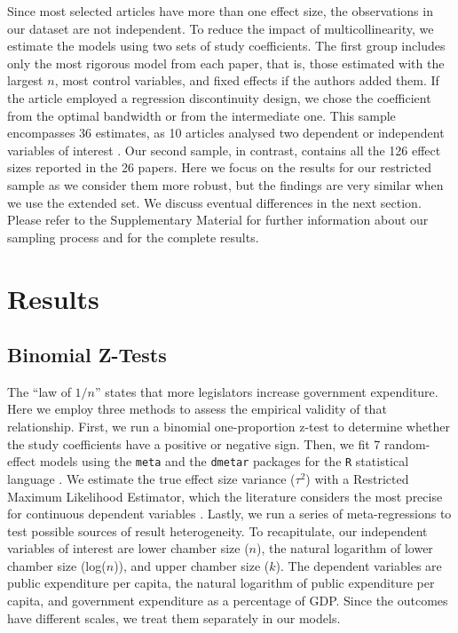 \documentclass[a4paper,12pt]{article}
\begin{document}
Since most selected articles have more than one effect size, the observations
in our dataset are not independent. To reduce the impact of multicollinearity,
we estimate the models using two sets of study coefficients. The first group
includes only the most rigorous model from each paper, that is, those estimated
with the largest $n$, most control variables, and fixed effects if the authors
added them. If the article employed a regression discontinuity design, we chose
the coefficient from the optimal bandwidth or from the intermediate one. This
sample encompasses 36 estimates, as 10 articles analysed two dependent or
independent variables of interest \citep{baqir1999districts, bjedov2014impact,
bradbury2001legislative, chen_malhotra_2007, crowley2019law,
lee2016supermajority, lee2018court, maldonado2013legislatures, primo2006stop,
ricciuti2003trading}. Our second sample, in contrast, contains all the 126 effect
sizes reported in the 26 papers. Here we focus on the results for our restricted
sample as we consider them more robust, but the findings are very similar when
we use the extended set. We discuss eventual differences in the next section.
Please refer to the Supplementary Material for further information about our
sampling process and for the complete results.

\section{Results}

\subsection{Binomial Z-Tests}
\label{sub:binomial}

The ``law of $1/n$'' states that more legislators increase government expenditure.
Here we employ three methods to assess the empirical validity of that
relationship. First, we run a binomial one-proportion z-test to determine
whether the study coefficients have a positive or negative sign. Then, we fit 7
random-effect models using the \texttt{meta} \citep{balduzzi2019perform} and the
\texttt{dmetar} \citep{dmetar2019} packages for the \texttt{R} statistical
language \citep{rstats2019}. We estimate the true effect size variance
($\tau^2$) with a Restricted Maximum Likelihood Estimator, which the literature
considers the most precise for continuous dependent variables
\citep{veroniki2016methods}. Lastly, we run a series of meta-regressions to test
possible sources of result heterogeneity. To recapitulate, our independent
variables of interest are lower chamber size ($n$), the natural logarithm of
lower chamber size (log($n$)), and upper chamber size ($k$). The dependent
variables are public expenditure per capita, the natural logarithm of public
expenditure per capita, and government expenditure as a percentage of GDP. Since
the outcomes have different scales, we treat them separately in our models.
\end{document}
